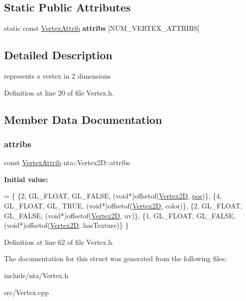 \subsection*{Static Public Attributes}
\begin{DoxyCompactItemize}
\item 
static const \hyperlink{structnta_1_1VertexAttrib}{Vertex\+Attrib} {\bfseries attribs} \mbox{[}N\+U\+M\+\_\+\+V\+E\+R\+T\+E\+X\+\_\+\+A\+T\+T\+R\+I\+BS\mbox{]}
\end{DoxyCompactItemize}


\subsection{Detailed Description}
represents a vertex in 2 dimensions 

Definition at line 20 of file Vertex.\+h.



\subsection{Member Data Documentation}
\mbox{\label{structnta_1_1Vertex2D_a6be835338c31e6ce40e1a2f5a3039560}} 
\subsubsection{\texorpdfstring{attribs}{attribs}}
{\footnotesize\ttfamily const \hyperlink{structnta_1_1VertexAttrib}{Vertex\+Attrib} nta\+::\+Vertex2\+D\+::attribs\hspace{0.3cm}{\ttfamily [static]}}

{\bfseries Initial value\+:}
\begin{DoxyCode}
= \{
        \{2, GL\_FLOAT, GL\_FALSE, (\textcolor{keywordtype}{void}*)offsetof(\hyperlink{structnta_1_1Vertex2D_a696744d55f56ae170684266eab073c0f}{Vertex2D}, \hyperlink{structnta_1_1Vertex2D_a27a44e1ca52b5a5a13d37495e9376636}{pos})\},
        \{4, GL\_FLOAT, GL\_TRUE,  (\textcolor{keywordtype}{void}*)offsetof(\hyperlink{structnta_1_1Vertex2D_a696744d55f56ae170684266eab073c0f}{Vertex2D}, color)\},
        \{2, GL\_FLOAT, GL\_FALSE, (\textcolor{keywordtype}{void}*)offsetof(\hyperlink{structnta_1_1Vertex2D_a696744d55f56ae170684266eab073c0f}{Vertex2D}, uv)\},
        \{1, GL\_FLOAT, GL\_FALSE, (\textcolor{keywordtype}{void}*)offsetof(\hyperlink{structnta_1_1Vertex2D_a696744d55f56ae170684266eab073c0f}{Vertex2D}, hasTexture)\}
    \}
\end{DoxyCode}


Definition at line 62 of file Vertex.\+h.



The documentation for this struct was generated from the following files\+:\begin{DoxyCompactItemize}
\item 
include/nta/Vertex.\+h\item 
src/Vertex.\+cpp\end{DoxyCompactItemize}
